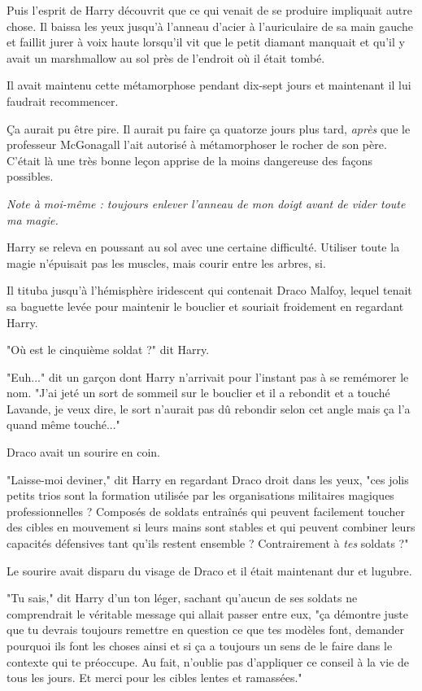 Puis l'esprit de Harry découvrit que ce qui venait de se produire impliquait autre chose. Il baissa les yeux jusqu'à l'anneau d'acier à l'auriculaire de sa main gauche et faillit jurer à voix haute lorsqu'il vit que le petit diamant manquait et qu'il y avait un marshmallow au sol près de l'endroit où il était tombé.

Il avait maintenu cette métamorphose pendant dix-sept jours et maintenant il lui faudrait recommencer.

Ça aurait pu être pire. Il aurait pu faire ça quatorze jours plus tard, \emph{après}  que le professeur McGonagall l'ait autorisé à métamorphoser le rocher de son père. C'était là une très bonne leçon apprise de la moins dangereuse des façons possibles.

\emph{Note à moi-même : toujours enlever l'anneau de mon doigt avant de vider toute ma magie.} 

Harry se releva en poussant au sol avec une certaine difficulté. Utiliser toute la magie n'épuisait pas les muscles, mais courir entre les arbres, si.

Il tituba jusqu'à l'hémisphère iridescent qui contenait Draco Malfoy, lequel tenait sa baguette levée pour maintenir le bouclier et souriait froidement en regardant Harry.

"Où est le cinquième soldat ?" dit Harry.

"Euh..." dit un garçon dont Harry n'arrivait pour l'instant pas à se remémorer le nom. "J'ai jeté un sort de sommeil sur le bouclier et il a rebondit et a touché Lavande, je veux dire, le sort n'aurait pas dû rebondir selon cet angle mais ça l'a quand même touché..."

Draco avait un sourire en coin.

"Laisse-moi deviner," dit Harry en regardant Draco droit dans les yeux, "ces jolis petits trios sont la formation utilisée par les organisations militaires magiques professionnelles ? Composés de soldats entraînés qui peuvent facilement toucher des cibles en mouvement si leurs mains sont stables et qui peuvent combiner leurs capacités défensives tant qu'ils restent ensemble ? Contrairement à \emph{tes}  soldats ?"

Le sourire avait disparu du visage de Draco et il était maintenant dur et lugubre.

"Tu sais," dit Harry d'un ton léger, sachant qu'aucun de ses soldats ne comprendrait le véritable message qui allait passer entre eux, "ça démontre juste que tu devrais toujours remettre en question ce que tes modèles font, demander pourquoi ils font les choses ainsi et si ça a toujours un sens de le faire dans le contexte qui te préoccupe. Au fait, n'oublie pas d'appliquer ce conseil à la vie de tous les jours. Et merci pour les cibles lentes et ramassées."

